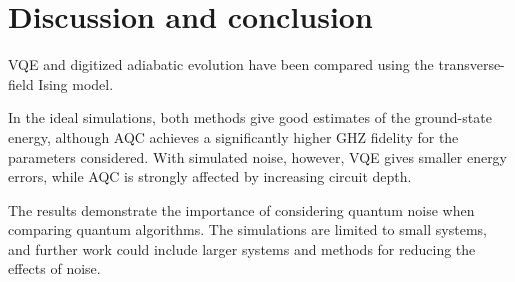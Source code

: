\documentclass[aps,prl,reprint,amsmath,amssymb,twocolumn,preprintnumbers,superscriptaddress,10pt]{revtex4-2}
\begin{document}
\section{Discussion and conclusion}

VQE and digitized adiabatic evolution have been compared using the transverse-field Ising model.

In the ideal simulations, both methods give good estimates of the ground-state energy, although AQC achieves a significantly higher GHZ fidelity for the parameters considered. 
With simulated noise, however, VQE gives smaller energy errors, while AQC is strongly affected by increasing circuit depth.

The results demonstrate the importance of considering quantum noise when comparing quantum algorithms. 
The simulations are limited to small systems, and further work could include larger systems and methods for reducing the effects of noise.




\end{document}
